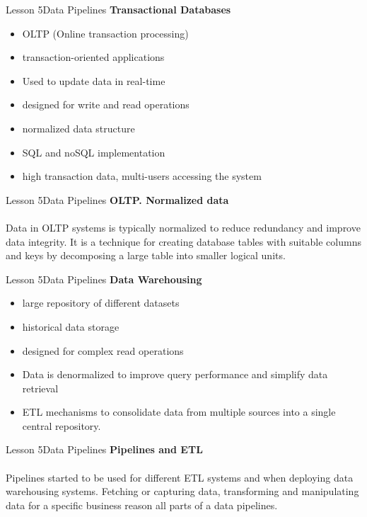 \documentclass[aspectratio=1610]{beamer}
\begin{document}
\begin{frame}{Lesson 5}{Data Pipelines}
\LARGE
\textbf{Transactional Databases}\\
\begin{itemize}
	\item OLTP (Online transaction processing)
	\item transaction-oriented applications
	\item Used to update data in real-time
	\item designed for write and read operations
	\item normalized data structure
	\item SQL and noSQL implementation
	\item high transaction data, multi-users accessing the system
\end{itemize}
\end{frame}


\begin{frame}{Lesson 5}{Data Pipelines}
\LARGE
\textbf{OLTP. Normalized data}\\~\\
Data in OLTP systems is typically normalized to reduce redundancy and improve 
data integrity. It is a technique for creating database tables with suitable 
columns and keys by decomposing a large table into smaller logical units.
\end{frame}


\begin{frame}{Lesson 5}{Data Pipelines}
\LARGE
\textbf{Data Warehousing}\\
\begin{itemize}
	\item large repository of different datasets
	\item historical data storage
	\item designed for complex read operations
	\item Data is denormalized to improve query performance and simplify data retrieval
	\item ETL mechanisms to consolidate data from multiple sources into a single central repository.
\end{itemize}
\end{frame}



\begin{frame}{Lesson 5}{Data Pipelines}
\LARGE
\textbf{Pipelines and ETL}\\~\\
Pipelines started to be used for different ETL systems and when deploying data 
warehousing systems. Fetching or capturing data, transforming and manipulating
data for a specific business reason all parts of a data pipelines.
\end{frame}
\end{document}
